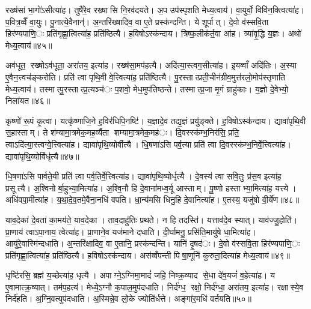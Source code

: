 रख्ष॑सां भा॒गो॑ऽसीत्या॑ह। तुषै॑रे॒व रख्षासि नि॒रव॑दयते। अ॒प उप॑स्पृशति मेध्य॒त्वाय॑। वा॒युर्वो॒ विवि॑न॒क्त्वित्या॑ह। प॒वित्र॒व्वैँ वा॒युः। पु॒नात्ये॒वैनान्॑। अ॒न्तरि॑ख्षादिव॒ वा ए॒ते प्रस्क॑न्दन्ति। ये शूर्पात्। दे॒वो व॑स्सवि॒ता हिर॑ण्यपाणि॒ः प्रति॑गृह्णा॒त्वित्या॑ह॒ प्रति॑ष्ठित्यै। ह॒विषोऽस्क॑न्दाय। त्रिष्फ॒लीक॑र्त॒वा आ॑ह। त्र्या॑वृ॒द्धि य॒ज्ञः। अथो॑ मेध्य॒त्वाय॑॥४५॥


अव॑धूत॒ रख्षोऽव॑धूता॒ अरा॑तय॒ इत्या॑ह। रख्ष॑सा॒मप॑हत्यै। अदि॑त्या॒स्त्वग॒सीत्या॑ह। इ॒यव्वाँ अदि॑तिः। अ॒स्या ए॒वैन॒त्त्वच॑ङ्करोति। प्रति॑ त्वा पृथि॒वी वे॒त्त्वित्या॑ह॒ प्रति॑ष्ठित्यै। पु॒रस्तात्प्रती॒चीन॑ग्रीव॒मुत्त॑रलो॒मोप॑स्तृणाति मेध्य॒त्वाय॑। तस्मात्पु॒रस्तात्प्र॒त्यञ्च॑ः प॒शवो॒ मेध॒मुप॑तिष्ठन्ते। तस्मात्प्र॒जा मृ॒गं ग्राहु॑काः। य॒ज्ञो दे॒वेभ्यो॒ निला॑यत॥४६॥

कृष्णो॑ रू॒पं कृ॒त्वा। यत्कृ॑ष्णाजि॒ने ह॒विर॑धिपि॒नष्टि॑। य॒ज्ञादे॒व तद्य॒ज्ञं प्रयु॑ङ्क्ते। ह॒विषोऽस्क॑न्दाय। द्यावा॑पृथि॒वी स॒हास्ताम्। ते श॑म्यामा॒त्रमेक॒मह॒र्व्यैता शम्यामा॒त्रमेक॒मह॑ः। दि॒वस्स्क॑म्भ॒निर॑सि॒ प्रति॒ त्वाऽदि॑त्या॒स्त्वग्वे॒त्त्वित्या॑ह। द्यावा॑पृथि॒व्योर्वीत्यै। धि॒षणा॑ऽसि पर्व॒त्या प्रति॑ त्वा दि॒वस्स्क॑म्भ॒निर्वे॒त्त्वित्या॑ह। द्यावा॑पृथि॒व्योर्विधृ॑त्यै॥४७॥

धि॒षणा॑ऽसि पार्वते॒यी प्रति॑ त्वा पर्व॒तिर्वे॒त्त्वित्या॑ह। द्यावा॑पृथि॒व्योर्धृत्यै। दे॒वस्य॑ त्वा सवि॒तुः प्र॑स॒व इत्या॑ह॒ प्रसूत्यै। अ॒श्विनोर्बा॒हुभ्या॒मित्या॑ह। अ॒श्वि॒नौ हि दे॒वाना॑मध्व॒र्यू आस्ताम्। पू॒ष्णो हस्ताभ्या॒मित्या॑ह॒ यत्त्ये। अधि॑वपा॒मीत्या॑ह। य॒था॒दे॒व॒तमे॒वैना॒नधि॑ वपति। धा॒न्य॑मसि धिनु॒हि दे॒वानित्या॑ह। ए॒तस्य॒ यजु॑षो वी॒र्ये॑ण॥४८॥

याव॒देका॑ दे॒वता॑ का॒मय॑ते॒ याव॒देका। ताव॒दाहु॑तिः प्रथते। न हि तदस्ति॑। यत्ताव॑दे॒व स्यात्। याव॑ज्जु॒होति॑। प्रा॒णाय॑ त्वाऽपा॒नाय॒ त्वेत्या॑ह। प्रा॒णाने॒व यज॑माने दधाति। दी॒र्घामनु॒ प्रसि॑ति॒मायु॑षे धा॒मित्या॑ह। आयु॑रे॒वास्मि॑न्दधाति। अ॒न्तरि॑क्षादिव॒ वा ए॒तानि॒ प्रस्क॑न्दन्ति। यानि॑ दृ॒षद॑ः। दे॒वो व॑स्सवि॒ता हिर॑ण्यपाणि॒ः प्रति॑गृह्णा॒त्वित्या॑ह॒ प्रति॑ष्ठित्यै। ह॒विषोऽस्क॑न्दाय। अस॑व्वँपन्ती पिषा॒णूनि॑ कुरुता॒दित्या॑ह मेध्य॒त्वाय॑॥४९॥


धृष्टि॑रसि॒ ब्रह्म॑ य॒च्छेत्या॑ह॒ धृत्यै। अपाग्ने॒ऽग्निमा॒मादं॑ जहि॒ निष्क्र॒व्याद से॒धा दे॑व॒यजं॑ व॒हेत्या॑ह। य ए॒वामात्क्र॒व्यात्। तम॑प॒हत्य॑। मेध्ये॒ऽग्नौ क॒पाल॒मुप॑दधाति। निर्द॑ग्ध॒ रक्षो॒ निर्द॑ग्धा॒ अरा॑तय॒ इत्या॑ह। रक्षास्ये॒व निर्द॑हति। अ॒ग्नि॒वत्युप॑दधाति। अ॒स्मिन्ने॒व लो॒के ज्योति॑र्धत्ते। अङ्गा॑र॒मधि॑ वर्तयति॥५०॥

